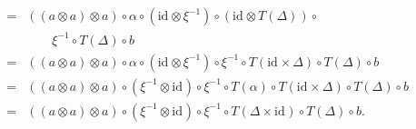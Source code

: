 \documentclass{LMCS}
\newcommand{\after}{\mathrel{\circ}}
\newcommand{\idmap}[1][]{\ensuremath{\mathrm{id}_{#1}}}
\begin{document}
{$$\begin{array}{rcl}
& = &
((a \otimes a) \otimes a) \after \alpha \after (\idmap \otimes \xi^{-1}) 
   \after (\idmap \otimes T(\Delta)) \after \\
& & \qquad
   \xi^{-1} \after T(\Delta) \after b \\
& = &
((a \otimes a) \otimes a) \after \alpha \after (\idmap \otimes \xi^{-1}) 
   \after \xi^{-1} \after T(\idmap \times \Delta) \after T(\Delta) \after b \\
& = &
((a \otimes a) \otimes a) \after (\xi^{-1} \otimes \idmap) \after \xi^{-1} 
   \after T(\alpha) \after T(\idmap \times \Delta) \after T(\Delta) \after b \\
& = &
((a \otimes a) \otimes a) \after (\xi^{-1} \otimes \idmap) \after \xi^{-1} 
   \after T(\Delta \times \idmap) \after T(\Delta) \after b.
\end{array}$$

}
\end{document}
